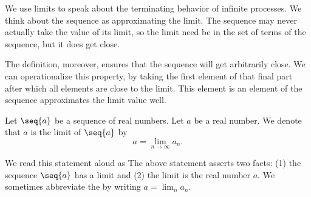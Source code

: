 
We use limits to speak about
the terminating behavior of
infinite processes.
We think about the sequence
as approximating the limit.
The sequence may never
actually take the value
of its limit, so the
limit need be in the
set of terms of the sequence,
but it does get close.

The definition, moreover,
ensures that the sequence
will get arbitrarily close.
We can operationalize this
property, by taking the first
element of that final part
after which all elements are
close to the limit.
This element is an element
of the sequence approximates
the limit value well.


Let $\seq{a}$
be a sequence of
real numbers.
Let $a$ be a real number.
We denote that $a$ is the limit of
$\seq{a}$ by
\[
  a = \lim_{n \to \infty} a_n.
\]

We read this statement aloud as
The above statement asserts two
facts: (1) the sequence
$\seq{a}$ has a limit and (2)
the limit is the real number $a$.
We sometimes abbreviate
the by writing
$a = \lim_{n} a_n$.
\strats
